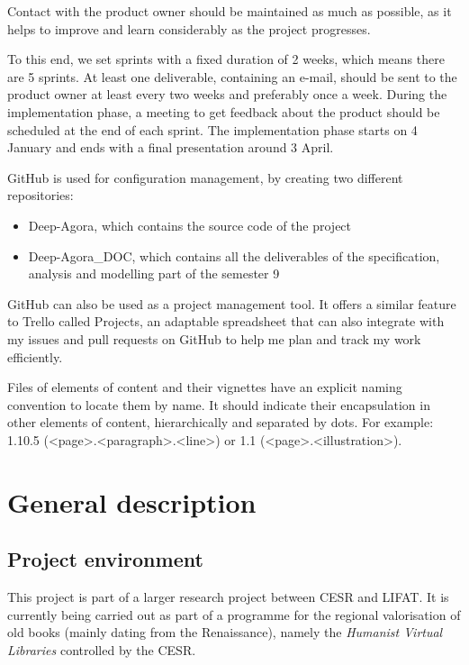 \documentclass{polytech/polytech}
\numberwithin{figure}{chapter}
\begin{document}
Contact with the product owner should be maintained as much as possible, as it helps to improve and learn considerably as the project progresses.

To this end, we set sprints with a fixed duration of 2 weeks, which means there are 5 sprints.
At least one deliverable, containing an e-mail, should be sent to the product owner at least every two weeks and preferably once a week.
During the implementation phase, a meeting to get feedback about the product should be scheduled at the end of each sprint.
The implementation phase starts on 4 January and ends with a final presentation around 3 April.

GitHub is used for configuration management, by creating two different repositories:
\begin{itemize}
\item Deep-Agora, which contains the source code of the project
\item Deep-Agora_DOC, which contains all the deliverables of the specification, analysis and modelling part of the semester 9
\end{itemize}

GitHub can also be used as a project management tool.
It offers a similar feature to Trello called Projects, an adaptable spreadsheet that can also integrate with my issues and pull requests on GitHub to help me plan and track my work efficiently.

Files of elements of content and their vignettes have an explicit naming convention to locate them by name.
It should indicate their encapsulation in other elements of content, hierarchically and separated by dots.
For example: 1.10.5 (<page>.<paragraph>.<line>) or 1.1 (<page>.<illustration>).



\chapter{General description}


\section{Project environment}

This project is part of a larger research project between CESR and LIFAT.
It is currently being carried out as part of a programme for the regional valorisation of old books (mainly dating from the Renaissance), namely the {\it Humanist Virtual Libraries} controlled by the CESR.
\end{document}
